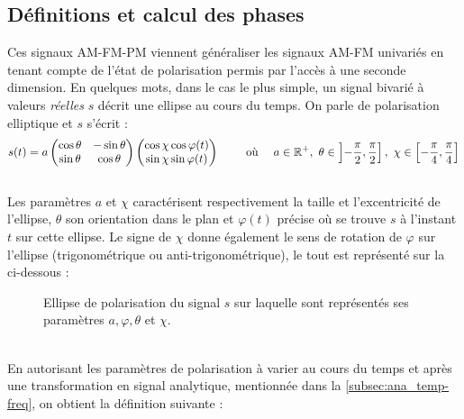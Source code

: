 \subsection{Définitions et calcul des phases} \label{subsec:AM-FM-PM}

Ces signaux AM-FM-PM viennent généraliser les signaux AM-FM univariés en tenant compte de l'état de polarisation permis par l'accès à une seconde dimension. 
En quelques mots, dans le cas le plus simple, un signal bivarié à valeurs \emph{réelles} $s$ décrit une ellipse au cours du temps. 
On parle de polarisation elliptique et $s$ s'écrit :
\[s(t) = a \begin{pmatrix} \cos\theta & -\sin\theta \\ \sin\theta  &  \cos\theta \end{pmatrix} \begin{pmatrix} \cos\chi \cos\varphi(t) \\ \sin\chi \sin\varphi(t) \end{pmatrix}  \qquad \text{ où }\quad  a\in\mathbb{R}^+,\ \theta \in \left]-\frac{\pi}{2}, \frac{\pi}{2}\right],\ \chi \in \left[-\frac{\pi}{4}, \frac{\pi}{4}\right] \]
\\
Les paramètres $a$ et $\chi$ caractérisent respectivement la taille et l'excentricité de l'ellipse, $\theta$ son orientation dans le plan et $\varphi(t)$ précise où se trouve $s$ à l'instant $t$ sur cette ellipse. Le signe de $\chi$ donne également le sens de rotation de $\varphi$ sur l'ellipse (trigonométrique ou anti-trigonométrique), le tout est représenté sur la  ci-dessous :
\begin{figure}[H]
	
	\caption[\DONE Ellipse de polarisation d'un signal bivarié réel]{Ellipse de polarisation du signal $s$ sur laquelle sont représentés ses paramètres $a,\varphi,\theta$ et $\chi$.}
	\label{fig:ellipse2polar}
\end{figure}
\skipl \\
En autorisant les paramètres de polarisation à varier au cours du temps et après une transformation en signal analytique, mentionnée dans la \cref{subsec:ana_temp-freq}, on obtient la définition suivante :
\\
